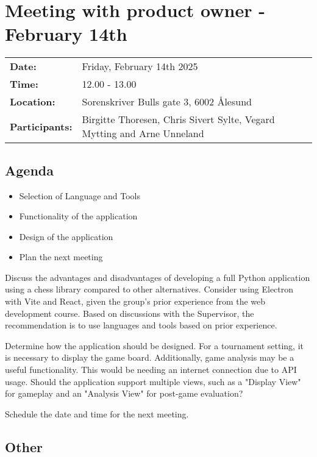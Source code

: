 \section{Meeting with product owner - February 14th}
\begin{tabular}{ll}
    \textbf{Date:} & Friday, February 14th 2025 \\
    \textbf{Time:} & 12.00 - 13.00\\
    \textbf{Location:} & Sorenskriver Bulls gate 3, 6002 Ålesund \\
    \textbf{Participants:} & Birgitte Thoresen, Chris Sivert Sylte, Vegard Mytting and Arne Unneland\\
\end{tabular}

\vspace{0.5cm}

\subsection{Agenda}

\begin{itemize}
    \item Selection of Language and Tools
    \item Functionality of the application
    \item Design of the application
    \item Plan the next meeting
\end{itemize}

Discuss the advantages and disadvantages of developing a full Python application using a chess library compared to other alternatives. Consider  using Electron with Vite and React, given the group's prior experience from the web development course. Based on discussions with the Supervisor, the recommendation is to use languages and tools based on prior experience.

Determine how the application should be designed. For a tournament setting, it is necessary to display the game board. Additionally, game analysis may be a useful functionality. This would be needing an internet connection due to API usage. Should the application support multiple views, such as a "Display View" for gameplay and an "Analysis View" for post-game evaluation?

Schedule the date and time for the next meeting.

\subsection{Other}